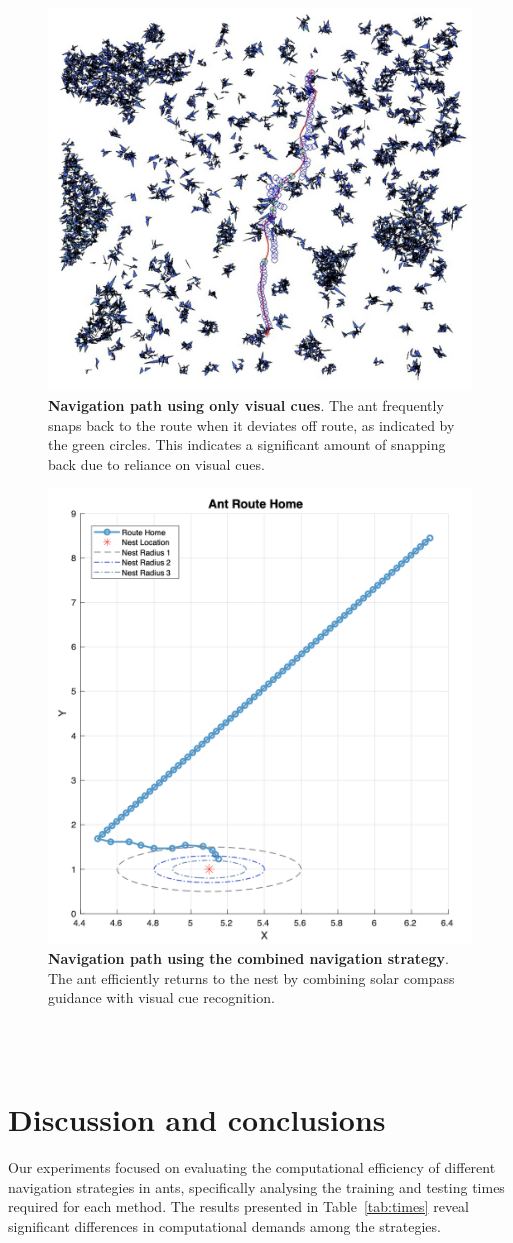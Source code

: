 \documentclass[12pt,a4paper]{article}
\begin{document}
\begin{figure}[H]
    \centering
    \includegraphics[width=0.5\linewidth]{pure_visual.png}
    \caption{\textbf{Navigation path using only visual cues}. The ant frequently snaps back to the route when it deviates off route, as indicated by the green circles. This indicates a significant amount of snapping back due to reliance on visual cues.}
    \label{fig:visual_cues_only}
\end{figure}

\begin{figure}[H]
    \centering
    \includegraphics[width=0.5\linewidth]{both.png}
    \caption{\textbf{Navigation path using the combined navigation strategy}. The ant efficiently returns to the nest by combining solar compass guidance with visual cue recognition.}
    \label{fig:combined_navigation}
\end{figure}

\\~\\
\section{Discussion and conclusions}

Our experiments focused on evaluating the computational efficiency of different navigation strategies in ants, specifically analysing the training and testing times required for each method. The results presented in Table~\ref{tab:times} reveal significant differences in computational demands among the strategies.
\end{document}
